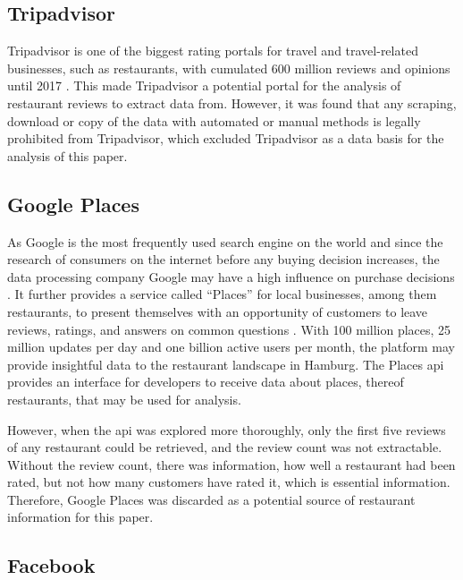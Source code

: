 \documentclass[a4paper, 11pt, oneside]{Thesis}  %
\begin{document}
\subsection{Tripadvisor}

Tripadvisor is one of the biggest rating portals for travel and travel-related businesses, such as restaurants, with cumulated 600 million reviews and opinions until 2017 \cite{StephenKaufer.27.04.2018}. This made Tripadvisor a potential portal for the analysis of restaurant reviews to extract data from. However, it was found that any scraping, download or copy of the data with automated or manual methods is legally prohibited from Tripadvisor, which excluded Tripadvisor as a data basis for the analysis of this paper.

\subsection{Google Places}

As Google is the most frequently used search engine on the world and since the research of consumers on the internet before any buying decision increases, the data processing company Google may have a high influence on purchase decisions \cite{Zhao.2018} \cite{Shim.2001}. It further provides a service called ``Places'' for local businesses, among them restaurants, to present themselves with an opportunity of customers to leave reviews, ratings, and answers on common questions \cite{GooglePlaces}. With 100 million places, 25 million updates per day and one billion active users per month, the platform may provide insightful data to the restaurant landscape in Hamburg. The Places \ac{api} provides an interface for developers to receive data about places, thereof restaurants, that may be used for analysis. 

However, when the \ac{api} was explored more thoroughly, only the first five reviews of any restaurant could be retrieved, and the review count was not extractable. Without the review count, there was information, how well a restaurant had been rated, but not how many customers have rated it, which is essential information. Therefore, Google Places was discarded as a potential source of restaurant information for this paper.

\subsection{Facebook}
\end{document}
